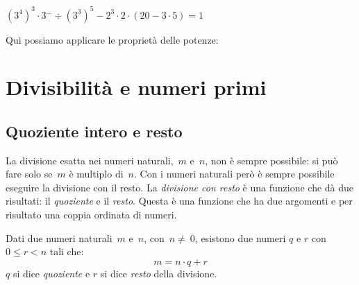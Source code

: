
\begin{esempio}{}{}
\quad \(\left(3^4 \right)^3 \cdot 3^{\dots} \div \left(3^3 \right)^5 -
  2^{3} \cdot 2 \cdot \left( 20 - 3 \cdot 5 \right) = 1\)

Qui possiamo applicare le proprietà delle potenze:

\end{esempio}

\section{Divisibilità e numeri primi}
\label{sec:nat_divsibilita}

\subsection{Quoziente intero e resto}

La divisione esatta nei numeri naturali,~\(m\) e~\(n\), non è sempre 
possibile: si può fare solo se~\(m\) è multiplo di~\(n\).
Con i numeri naturali però è sempre possibile eseguire la divisione con il 
resto. La \emph{divisione con resto} è una funzione che dà due risultati:
il \emph{quoziente} e il \emph{resto}. 
Questa è una funzione che ha due argomenti e per risultato una coppia 
ordinata di numeri.

\begin{definizione}{}{}
 Dati due numeri naturali~\(m\) e~\(n\), con~\(n\neq~0\), 
 esistono due numeri \(q\) e \(r\) con \(0 \leqslant r < n\) 
 tali che: 
 \[m = n \cdot q + r\] 
 \(q\) si dice \emph{quoziente} e \(r\) si dice \emph{resto} della divisione.
\end{definizione}

